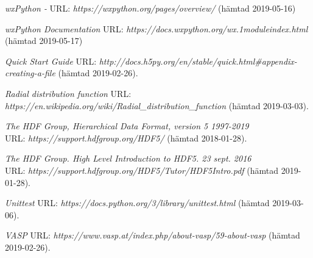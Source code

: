 \begin{thebibliography}{99}
 \textit{wxPython -} URL:
\textit{https://wxpython.org/pages/overview/} (hämtad 2019-05-16)

 \textit{wxPython Documentation} URL: \textit{https://docs.wxpython.org/wx.1moduleindex.html} (hämtad 2019-05-17)

 \textit{Quick Start Guide} URL: \textit{http://docs.h5py.org/en/stable/quick.html\#appendix-creating-a-file} (hämtad 2019-02-26).

\textit{Radial distribution function} URL: \textit{https://en.wikipedia.org/wiki/Radial\_distribution\_function}
(hämtad 2019-03-03).

 \textit{The HDF Group, Hierarchical Data Format, version 5 1997-2019} \\
URL: \textit{https://support.hdfgroup.org/HDF5/} 
(hämtad 2018-01-28).

\textit{The HDF Group. High Level Introduction to HDF5. 23 sept. 2016} \\ URL: \textit{https://support.hdfgroup.org/HDF5/Tutor/HDF5Intro.pdf} (hämtad 2019-01-28).

 \textit{Unittest} URL: \textit{https://docs.python.org/3/library/unittest.html} (hämtad 2019-03-06).

 \textit{VASP} URL: \textit{https://www.vasp.at/index.php/about-vasp/59-about-vasp} (hämtad 2019-02-26).




 
\end{thebibliography}